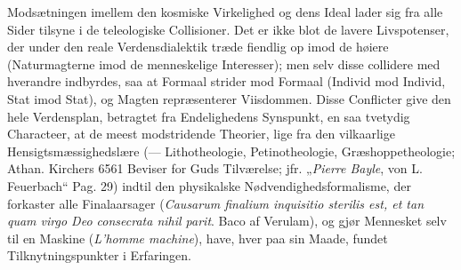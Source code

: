 \documentclass[12pt]{book}
\newcommand{\opage}[1]{\marginnote{\footnotesize\textit{[#1]}}}
\begin{document}
Modsætningen imellem den kosmiske Virkelighed og dens Ideal lader
sig fra alle Sider tilsyne i de teleologiske Collisioner. Det er
ikke blot de lavere Livspotenser, der under den reale
Verdensdialektik træde fiendlig op imod de høiere (Naturmagterne
imod de menneskelige Interesser); men selv disse collidere med
hverandre indbyrdes, saa at Formaal strider mod Formaal (Individ
mod Individ, Stat imod Stat), og Magten repræsenterer Viisdommen.
Disse Conflicter give den hele Verdensplan, betragtet fra
Endelighedens Synspunkt, en saa tvetydig Characteer, at de meest
modstridende Theorier, lige fra den vilkaarlige
Hensigtsmæssighedslære (--- Lithotheologie, Petinotheologie,
Græshoppetheologie; Athan. Kirchers 6561 Beviser for Guds
Tilværelse; jfr. „\textit{Pierre Bayle}, von L. Feuerbach“ Pag. 29)
indtil den physikalske Nødvendighedsformalisme, der forkaster alle
Finalaarsager (\textit{Causarum finalium inquisitio sterilis est, et tan}%
\opage{241} %
\textit{quam virgo Deo consecrata nihil parit}. Baco af Verulam),
og gjør Mennesket selv til en Maskine (\textit{L'homme machine}), have, hver paa sin
Maade, fundet Tilknytningspunkter i Erfaringen.
\end{document}
